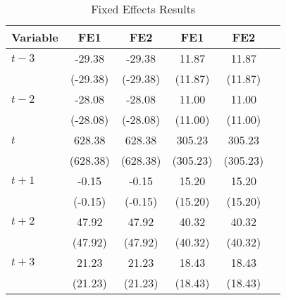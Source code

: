 \documentclass{article}
\begin{document}
\begin{table}
\centering
\begin{tabular}{lccccc}
\toprule
Variable & FE1 & FE2 & FE1 & FE2 \\
\midrule
$t-3$ & -29.38 & -29.38 & 11.87 & 11.87 \\
 & (-29.38) & (-29.38) & (11.87) & (11.87) \\
$t-2$ & -28.08 & -28.08 & 11.00 & 11.00 \\
 & (-28.08) & (-28.08) & (11.00) & (11.00) \\
$t$ & 628.38 & 628.38 & 305.23 & 305.23 \\
 & (628.38) & (628.38) & (305.23) & (305.23) \\
$t+1$ & -0.15 & -0.15 & 15.20 & 15.20 \\
 & (-0.15) & (-0.15) & (15.20) & (15.20) \\
$t+2$ & 47.92 & 47.92 & 40.32 & 40.32 \\
 & (47.92) & (47.92) & (40.32) & (40.32) \\
$t+3$ & 21.23 & 21.23 & 18.43 & 18.43 \\
 & (21.23) & (21.23) & (18.43) & (18.43) \\
\bottomrule
\end{tabular}
\caption{Fixed Effects Results}
\end{table}
\end{document}
